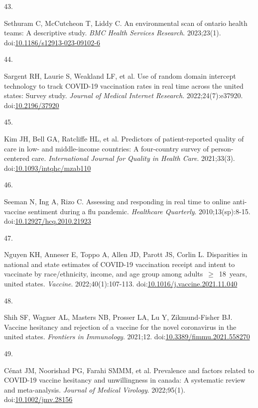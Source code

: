 \documentclass[
]{article}
\newlength{\cslhangindent}
\newlength{\csllabelwidth}
\newlength{\cslentryspacingunit} %
\newenvironment{CSLReferences}[2] %
 {%
  \setlength{\parindent}{0pt}
  \ifodd #1
  \let\oldpar\par
  \def\par{\hangindent=\cslhangindent\oldpar}
  \fi
  \setlength{\parskip}{#2\cslentryspacingunit}
 }%
 {}
\newcommand{\CSLLeftMargin}[1]{\parbox[t]{\csllabelwidth}{#1}}
\newcommand{\CSLRightInline}[1]{\parbox[t]{\linewidth - \csllabelwidth}{#1}\break}
\begin{document}
\begin{CSLReferences}{0}{0}
\leavevmode{}%
\CSLLeftMargin{43. }%
\CSLRightInline{Sethuram C, McCutcheon T, Liddy C. An environmental scan
of ontario health teams: A descriptive study. \emph{{BMC} Health
Services Research}. 2023;23(1).
doi:\href{https://doi.org/10.1186/s12913-023-09102-6}{10.1186/s12913-023-09102-6}}

\leavevmode{}%
\CSLLeftMargin{44. }%
\CSLRightInline{Sargent RH, Laurie S, Weakland LF, et al. Use of random
domain intercept technology to track {COVID}-19 vaccination rates in
real time across the united states: Survey study. \emph{Journal of
Medical Internet Research}. 2022;24(7):e37920.
doi:\href{https://doi.org/10.2196/37920}{10.2196/37920}}

\leavevmode{}%
\CSLLeftMargin{45. }%
\CSLRightInline{Kim JH, Bell GA, Ratcliffe HL, et al. Predictors of
patient-reported quality of care in low- and middle-income countries: A
four-country survey of person-centered care. \emph{International Journal
for Quality in Health Care}. 2021;33(3).
doi:\href{https://doi.org/10.1093/intqhc/mzab110}{10.1093/intqhc/mzab110}}

\leavevmode{}%
\CSLLeftMargin{46. }%
\CSLRightInline{Seeman N, Ing A, Rizo C. Assessing and responding in
real time to online anti-vaccine sentiment during a flu pandemic.
\emph{Healthcare Quarterly}. 2010;13(sp):8-15.
doi:\href{https://doi.org/10.12927/hcq.2010.21923}{10.12927/hcq.2010.21923}}

\leavevmode{}%
\CSLLeftMargin{47. }%
\CSLRightInline{Nguyen KH, Anneser E, Toppo A, Allen JD, Parott JS,
Corlin L. Disparities in national and state estimates of {COVID}-19
vaccination receipt and intent to vaccinate by race/ethnicity, income,
and age group among adults~\(\geq\)~18~years, united states.
\emph{Vaccine}. 2022;40(1):107-113.
doi:\href{https://doi.org/10.1016/j.vaccine.2021.11.040}{10.1016/j.vaccine.2021.11.040}}

\leavevmode{}%
\CSLLeftMargin{48. }%
\CSLRightInline{Shih SF, Wagner AL, Masters NB, Prosser LA, Lu Y,
Zikmund-Fisher BJ. Vaccine hesitancy and rejection of a vaccine for the
novel coronavirus in the united states. \emph{Frontiers in Immunology}.
2021;12.
doi:\href{https://doi.org/10.3389/fimmu.2021.558270}{10.3389/fimmu.2021.558270}}

\leavevmode{}%
\CSLLeftMargin{49. }%
\CSLRightInline{Cénat JM, Noorishad PG, Farahi SMMM, et al. Prevalence
and factors related to {COVID}-19 vaccine hesitancy and unwillingness in
canada: A systematic review and meta-analysis. \emph{Journal of Medical
Virology}. 2022;95(1).
doi:\href{https://doi.org/10.1002/jmv.28156}{10.1002/jmv.28156}}


\end{CSLReferences}
\end{document}
